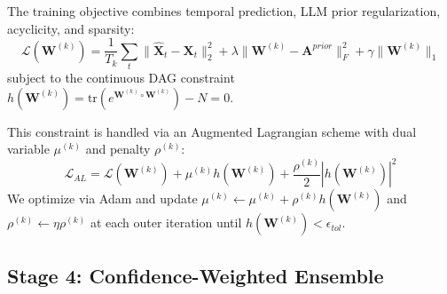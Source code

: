 The training objective combines temporal prediction, LLM prior regularization, acyclicity, and sparsity:
\begin{equation}
    \mathcal{L}(\mathbf{W}^{(k)}) = \frac{1}{T_k}\sum_t\|\hat{\mathbf{X}}_t - \mathbf{X}_t\|_2^2 + \lambda \|\mathbf{W}^{(k)} - \mathbf{A}^{prior}\|_F^2 + \gamma \|\mathbf{W}^{(k)}\|_1
\end{equation}
subject to the continuous DAG constraint $h(\mathbf{W}^{(k)}) = \text{tr}(e^{\mathbf{W}^{(k)} \circ \mathbf{W}^{(k)}}) - N = 0$.

This constraint is handled via an Augmented Lagrangian scheme with dual variable $\mu^{(k)}$ and penalty $\rho^{(k)}$:
\begin{equation}
    \mathcal{L}_{AL} = \mathcal{L}(\mathbf{W}^{(k)}) + \mu^{(k)} h(\mathbf{W}^{(k)}) + \frac{\rho^{(k)}}{2}\left|h(\mathbf{W}^{(k)})\right|^2
\end{equation}
We optimize via Adam and update $\mu^{(k)} \leftarrow \mu^{(k)} + \rho^{(k)} h(\mathbf{W}^{(k)})$ and $\rho^{(k)} \leftarrow \eta \rho^{(k)}$ at each outer iteration until $h(\mathbf{W}^{(k)}) < \epsilon_{tol}$.

\subsection{Stage 4: Confidence-Weighted Ensemble}

